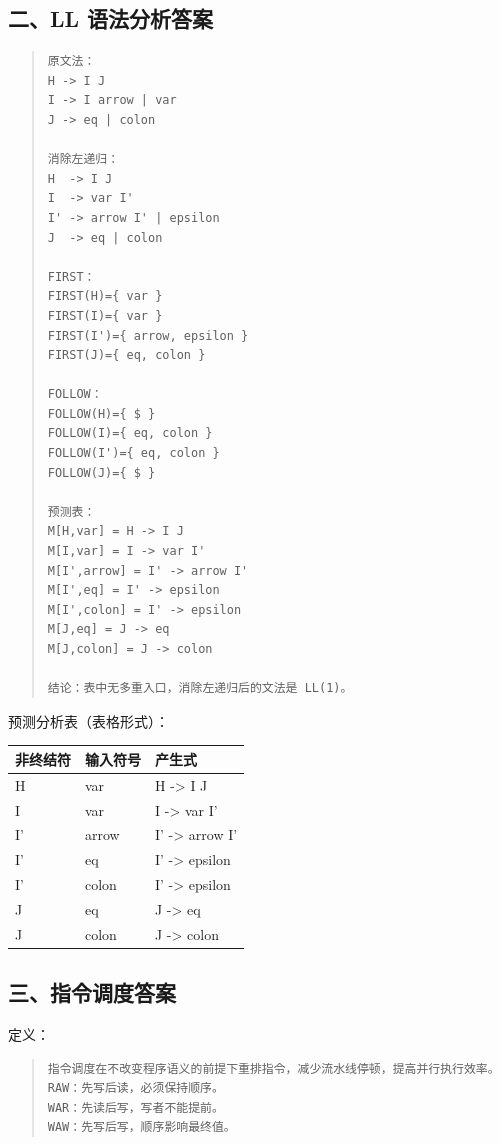 \documentclass[UTF8,zihao=-4]{ctexart}
\begin{document}
\subsection{二、LL 语法分析答案}


\begin{quote}
\footnotesize
\begin{verbatim}
原文法：
H -> I J
I -> I arrow | var
J -> eq | colon

消除左递归：
H  -> I J
I  -> var I'
I' -> arrow I' | epsilon
J  -> eq | colon

FIRST：
FIRST(H)={ var }
FIRST(I)={ var }
FIRST(I')={ arrow, epsilon }
FIRST(J)={ eq, colon }

FOLLOW：
FOLLOW(H)={ $ }
FOLLOW(I)={ eq, colon }
FOLLOW(I')={ eq, colon }
FOLLOW(J)={ $ }

预测表：
M[H,var] = H -> I J
M[I,var] = I -> var I'
M[I',arrow] = I' -> arrow I'
M[I',eq] = I' -> epsilon
M[I',colon] = I' -> epsilon
M[J,eq] = J -> eq
M[J,colon] = J -> colon

结论：表中无多重入口，消除左递归后的文法是 LL(1)。
\end{verbatim}
\end{quote}

预测分析表（表格形式）：

\begin{center}
\footnotesize
\begin{tabular}{lll}
\hline
非终结符 & 输入符号 & 产生式 \\
\hline
H & var & H -> I J \\
I & var & I -> var I' \\
I' & arrow & I' -> arrow I' \\
I' & eq & I' -> epsilon \\
I' & colon & I' -> epsilon \\
J & eq & J -> eq \\
J & colon & J -> colon \\
\hline
\end{tabular}
\end{center}



\subsection{三、指令调度答案}


定义：


\begin{quote}
\footnotesize
\begin{verbatim}
指令调度在不改变程序语义的前提下重排指令，减少流水线停顿，提高并行执行效率。
RAW：先写后读，必须保持顺序。
WAR：先读后写，写者不能提前。
WAW：先写后写，顺序影响最终值。
\end{verbatim}
\end{quote}
\end{document}
